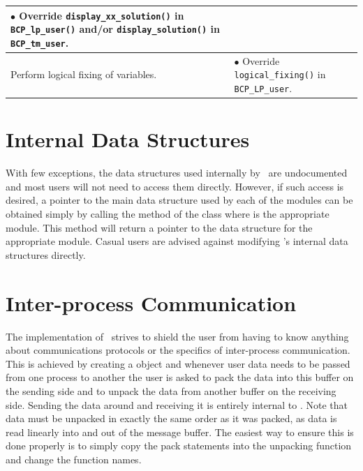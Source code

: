 {\begin{longtable}{|p{2in}|p{3.65in}|}
\begin{minipage}[t]{3.65in}
$\bullet$ Override {\tt display\_xx\_solution()} in {\tt BCP\_lp\_user()} 
and/or {\tt display\_solution()} in {\tt BCP\_tm\_user}.

\end{minipage}\\

\hline

Perform logical fixing of variables. & 

\begin{minipage}[t]{3.65in}

$\bullet$ Override {\tt logical\_fixing()} in {\tt BCP\_LP\_user}.

\end{minipage}\\

\hline

\end{longtable}
}

\section{Internal Data Structures}

With few exceptions, the data structures used internally by 
\BB\ are undocumented and most users will not need to access them
directly. However, if such access is desired, a pointer to the main data
structure used by each of the modules can be obtained simply by calling
the method  of the  class where
 is the appropriate module. This method will return a pointer to the
data structure for the appropriate module. Casual users are advised against
modifying \BB's internal data structures directly.

\section{Inter-process Communication}
\label{communication}
The implementation of \BB\ strives to shield the user from having to know
anything about communications protocols or the specifics of inter-process
communication. This is achieved by creating a  object and
whenever user data needs to be passed from one process to another the user is
asked to pack the data into this buffer on the sending side and to unpack the
data from another buffer on the receiving side. Sending the data around and
receiving it is entirely internal to \BB. Note that data must be unpacked in
exactly the same order as it was packed, as data is read linearly into and out
of the message buffer. The easiest way to ensure this is done properly is to
simply copy the pack statements into the unpacking function and change the
function names.

